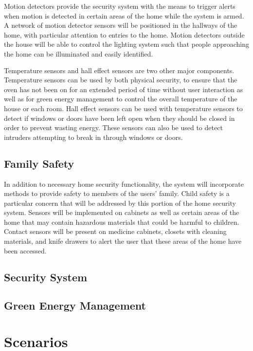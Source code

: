 \documentclass{report}
\begin{document}
Motion detectors provide the security system with the means to trigger alerts 
when motion is detected in certain areas of the home while the system is armed.
A network of motion detector sensors will be positioned in the hallways of the
home, with particular attention to entries to the home. Motion detectors
outside the house will be able to control the lighting system such that people
approaching the home can be illuminated and easily identified.

Temperature sensors and hall effect sensors are two other major components.
Temperature sensors can be used by both physical security, to ensure that the
oven has not been on for an extended period of time without user interaction as
well as for green energy management to control the overall temperature of the
house or each room. Hall effect sensors can be used with temperature sensors to
detect if windows or doors have been left open when they should be closed in
order to prevent wasting energy. These sensors can also be used to detect
intruders attempting to break in through windows or doors.

\subsection{Family Safety}

In addition to necessary home security functionality, the system will
incorporate methods to provide safety to members of the users' family. Child
safety is a particular concern that will be addressed by this portion of the
home security system. Sensors will be implemented on cabinets as well as
certain areas of the home that may contain hazardous materials that could be
harmful to children. Contact sensors will be present on medicine cabinets,
closets with cleaning materials, and knife drawers to alert the user that these
areas of the home have been accessed.

\subsection{Security System}

\subsection{Green Energy Management}



\section{Scenarios}
\end{document}
